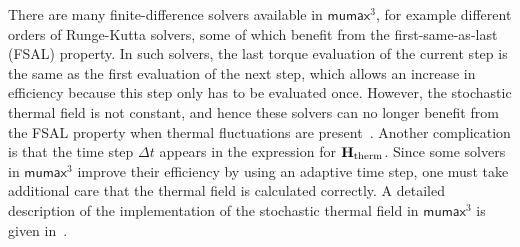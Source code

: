 \documentclass[11pt,a4paper,english,twoside]{article}
\newcommand{\mumax}{$\mathsf{mumax}^3$}
\begin{document}
There are many finite-difference solvers available in \mumax{}, for example different orders of Runge-Kutta solvers, some of which benefit from the first-same-as-last (FSAL) property. In such solvers, the last torque evaluation of the current step is the same as the first evaluation of the next step, which allows an increase in efficiency because this step only has to be evaluated once. However, the stochastic thermal field is not constant, and hence these solvers can no longer benefit from the FSAL property when thermal fluctuations are present~\cite{LEL-17b}. Another complication is that the time step $\Delta t$ appears in the expression for $\vb{H_\mathrm{therm}}$. Since some solvers in \mumax{} improve their efficiency by using an adaptive time step, one must take additional care that the thermal field is calculated correctly. A detailed description of the implementation of the stochastic thermal field in \mumax{} is given in~\cite{LEL-17b}.

\cleardoublepage
\end{document}
